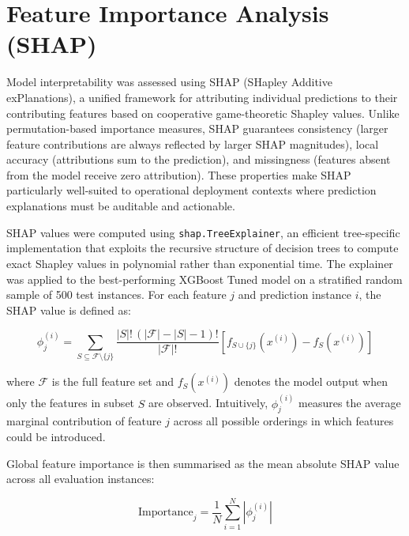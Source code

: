 \documentclass{report}
\begin{document}
\section{Feature Importance Analysis (SHAP)}
\label{sec:shap_method}

Model interpretability was assessed using SHAP (SHapley Additive
exPlanations), a unified framework for attributing individual predictions to
their contributing features based on cooperative game-theoretic Shapley
values.  Unlike permutation-based importance measures, SHAP guarantees
consistency (larger feature contributions are always reflected by larger SHAP
magnitudes), local accuracy (attributions sum to the prediction), and
missingness (features absent from the model receive zero attribution).  These
properties make SHAP particularly well-suited to operational deployment
contexts where prediction explanations must be auditable and actionable.

SHAP values were computed using \texttt{shap.TreeExplainer}, an efficient
tree-specific implementation that exploits the recursive structure of
decision trees to compute exact Shapley values in polynomial rather than
exponential time.  The explainer was applied to the best-performing XGBoost
Tuned model on a stratified random sample of 500 test instances.  For each
feature $j$ and prediction instance $i$, the SHAP value is defined as:

\begin{equation}
\phi^{(i)}_j = \sum_{S \subseteq \mathcal{F} \setminus \{j\}}
\frac{|S|!\,(|\mathcal{F}| - |S| - 1)!}{|\mathcal{F}|!}
\left[ f_{S \cup \{j\}}(x^{(i)}) - f_S(x^{(i)}) \right]
\label{eq:shap}
\end{equation}

where $\mathcal{F}$ is the full feature set and $f_S(x^{(i)})$ denotes the
model output when only the features in subset $S$ are observed.  Intuitively,
$\phi^{(i)}_j$ measures the average marginal contribution of feature $j$
across all possible orderings in which features could be introduced.

Global feature importance is then summarised as the mean absolute SHAP value
across all evaluation instances:

\begin{equation}
\text{Importance}_j = \frac{1}{N} \sum_{i=1}^{N} \left| \phi^{(i)}_j \right|
\label{eq:shap_global}
\end{equation}
\end{document}
